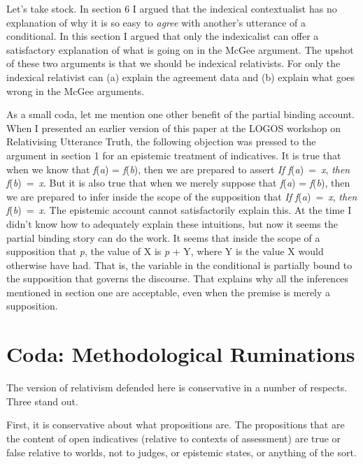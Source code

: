 \documentclass[
  10pt,
  letterpaper,
  DIV=11,
  numbers=noendperiod,
  twoside]{scrartcl}
\begin{document}
Let's take stock. In section 6 I argued that the indexical contextualist
has no explanation of why it is so easy to \emph{agree} with another's
utterance of a conditional. In this section I argued that only the
indexicalist can offer a satisfactory explanation of what is going on in
the McGee argument. The upshot of these two arguments is that we should
be indexical relativists. For only the indexical relativist can (a)
explain the agreement data and (b) explain what goes wrong in the McGee
arguments.

As a small coda, let me mention one other benefit of the partial binding
account. When I presented an earlier version of this paper at the LOGOS
workshop on Relativising Utterance Truth, the following objection was
pressed to the argument in section 1 for an epistemic treatment of
indicatives. It is true that when we know that \emph{f}(\emph{a}) =
\emph{f}(\emph{b}), then we are prepared to assert \emph{If
f}(\emph{a})~=~\emph{x}, \emph{then f}(\emph{b})~=~\emph{x}. But it is
also true that when we merely suppose that \emph{f}(\emph{a}) =
\emph{f}(\emph{b}), then we are prepared to infer inside the scope of
the supposition that \emph{If f}(\emph{a})~=~\emph{x}, \emph{then
f}(\emph{b})~=~\emph{x}. The epistemic account cannot satisfactorily
explain this. At the time I didn't know how to adequately explain these
intuitions, but now it seems the partial binding story can do the work.
It seems that inside the scope of a supposition that \emph{p}, the value
of X is \emph{p} + Y, where Y is the value X would otherwise have had.
That is, the variable in the conditional is partially bound to the
supposition that governs the discourse. That explains why all the
inferences mentioned in section one are acceptable, even when the
premise is merely a supposition.

\section*{Coda: Methodological
Ruminations}\label{coda-methodological-ruminations}

The version of relativism defended here is conservative in a number of
respects. Three stand out.

First, it is conservative about what propositions are. The propositions
that are the content of open indicatives (relative to contexts of
assessment) are true or false relative to worlds, not to judges, or
epistemic states, or anything of the sort.
\end{document}
